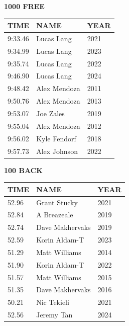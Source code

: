 \begin{table}[H]
\centering
\begin{minipage}[t]{0.48\textwidth}
\centering
\textbf{1000 FREE}\\[0.1cm]
\begin{tabular}{@{}p{1.8cm}p{2.8cm}p{1.2cm}@{}}
\hline
    \textbf{TIME} & \textbf{NAME} & \textbf{YEAR} \\
\hline
    9:33.46 & Lucas Lang & 2021 \\
    9:34.99 & Lucas Lang & 2023 \\
    9:35.74 & Lucas Lang & 2022 \\
    9:46.90 & Lucas Lang & 2024 \\
    9:48.42 & Alex Mendoza & 2011 \\
    9:50.76 & Alex Mendoza & 2013 \\
    9:53.07 & Joe Zales & 2019 \\
    9:55.04 & Alex Mendoza & 2012 \\
    9:56.02 & Kyle Fendorf & 2018 \\
    9:57.73 & Alex Johnson & 2022 \\
\hline
\end{tabular}
\end{minipage}\hfill
\begin{minipage}[t]{0.48\textwidth}
\centering
\textbf{100 BACK}\\[0.1cm]
\begin{tabular}{@{}p{1.8cm}p{2.8cm}p{1.2cm}@{}}
\hline
    \textbf{TIME} & \textbf{NAME} & \textbf{YEAR} \\
\hline
    52.96 & Grant Stucky & 2021 \\
    52.84 & A Breazeale & 2019 \\
    52.74 & Dave Makhervaks & 2019 \\
    52.59 & Korin Aldam-T & 2023 \\
    51.29 & Matt Williams & 2014 \\
    51.90 & Korin Aldam-T & 2022 \\
    51.57 & Matt Williams & 2015 \\
    51.35 & Dave Makhervaks & 2016 \\
    50.21 & Nic Tekieli & 2021 \\
    52.56 & Jeremy Tan & 2024 \\
\hline
\end{tabular}
\end{minipage}
\end{table}

